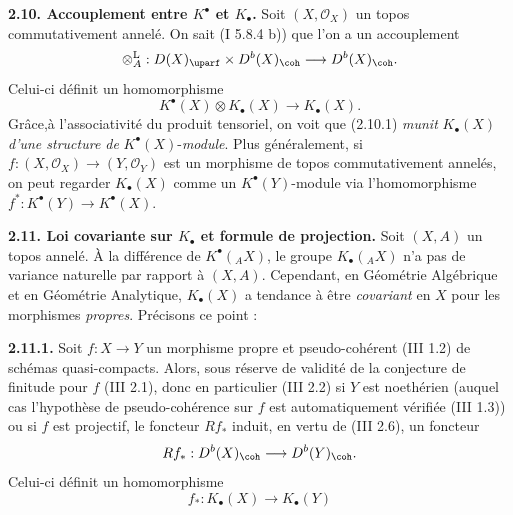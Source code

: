 \textbf{2.10. Accouplement entre \(K^{\bullet}\) et \(K_{\bullet}\).} Soit \((X,\mathcal O_X)\) un topos commutativement annelé. On sait (I 5.8.4 b)) que l'on a un accouplement
\[
 \otimes_A^{\mathrm L}:D(X)_{\uparf}\times D^b(X)_{\coh}
 \longrightarrow D^b(X)_{\coh}.
\]
Celui-ci définit un homomorphisme
\begin{equation}\tag{2.10.1}
 K^{\bullet}(X)\otimes K_{\bullet}(X)\longrightarrow K_{\bullet}(X).
\end{equation}
Grâce,à l'associativité du produit tensoriel, on voit que (2.10.1) \emph{munit} \(K_{\bullet}(X)\) \emph{d'une structure de} \(K^{\bullet}(X)\)-\emph{module}. Plus généralement, si \(f:(X,\mathcal O_X)\longrightarrow(Y,\mathcal O_Y)\) est un morphisme de topos commutativement annelés, on peut regarder \(K_{\bullet}(X)\) comme un \(K^{\bullet}(Y)\)-module via l'homomorphisme \(f^*:K^{\bullet}(Y)\longrightarrow K^{\bullet}(X)\).

\textbf{2.11. Loi covariante sur \(K_{\bullet}\) et formule de projection.} Soit \((X,A)\) un topos annelé. À la différence de \(K^{\bullet}({}_A X)\), le groupe \(K_\bullet({}_A X)\) n'a pas de variance naturelle par rapport à \((X,A)\). Cependant, en Géométrie Algébrique et en Géométrie Analytique, \(K_{\bullet}(X)\) a tendance à être \emph{covariant} en \(X\) pour les morphismes \emph{propres}. Précisons ce point :

\textbf{2.11.1.} Soit \(f:X\to Y\) un morphisme propre et pseudo-cohérent (III 1.2) de schémas quasi-compacts. Alors, sous réserve de validité de la conjecture de finitude pour \(f\) (III 2.1), donc en particulier (III 2.2) si \(Y\) est noethérien (auquel cas l'hypothèse de pseudo-cohérence sur \(f\) est automatiquement vérifiée (III 1.3)) ou si \(f\) est projectif, le foncteur \(Rf_*\) induit, en vertu de (III 2.6), un foncteur
\[
 Rf_*:D^b(X)_{\coh}\longrightarrow D^b(Y)_{\coh}.
\]
Celui-ci définit un
homomorphisme
\begin{equation}\tag{2.11.1.1}
 f_*:K_{\bullet}(X)\longrightarrow K_{\bullet}(Y)
\end{equation}
